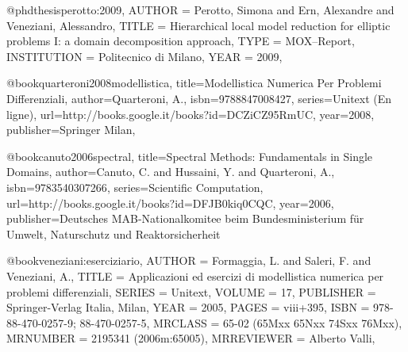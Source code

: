@phdthesis{perotto:2009,
     AUTHOR = {Perotto, Simona and Ern, Alexandre and Veneziani, Alessandro},
      TITLE = {Hierarchical local model reduction for elliptic problems I: a domain decomposition approach},
       TYPE = {MOX--Report},
INSTITUTION = {Politecnico di Milano},
       YEAR = {2009},
}

@book{quarteroni2008modellistica,
  title={Modellistica Numerica Per Problemi Differenziali},
  author={Quarteroni, A.},
  isbn={9788847008427},
  series={Unitext (En ligne)},
  url={http://books.google.it/books?id=DCZiCZ95RmUC},
  year={2008},
  publisher={Springer Milan},
}

@book{canuto2006spectral,
  title={Spectral Methods: Fundamentals in Single Domains},
  author={Canuto, C. and Hussaini, Y. and Quarteroni, A.},
  isbn={9783540307266},
  series={Scientific Computation},
  url={http://books.google.it/books?id=DFJB0kiq0CQC},
  year={2006},
  publisher={Deutsches MAB-Nationalkomitee beim Bundesministerium f{\"u}r Umwelt, Naturschutz und Reaktorsicherheit}
}

@book{veneziani:eserciziario,
    AUTHOR = {Formaggia, L. and Saleri, F. and Veneziani, A.},
     TITLE = {Applicazioni ed esercizi di modellistica numerica per problemi
              differenziali},
    SERIES = {Unitext},
    VOLUME = {17},
 PUBLISHER = {Springer-Verlag Italia, Milan},
      YEAR = {2005},
     PAGES = {viii+395},
      ISBN = {978-88-470-0257-9; 88-470-0257-5},
   MRCLASS = {65-02 (65Mxx 65Nxx 74Sxx 76Mxx)},
  MRNUMBER = {2195341 (2006m:65005)},
MRREVIEWER = {Alberto Valli},
}
